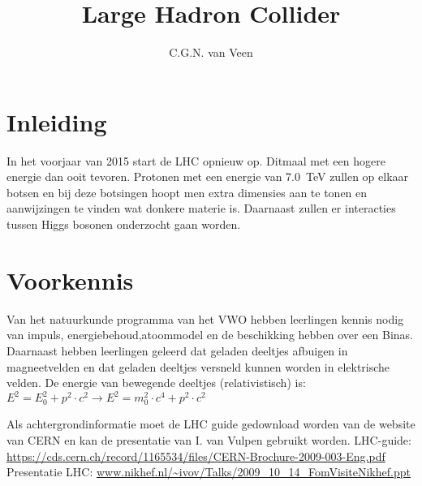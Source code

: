 

\usepackage{hepnames}
\usepackage[version=3]{mhchem}
\usepackage{lipsum}
\usepackage{pgfplots}
\usepackage{amsmath}
\usepackage{tikz}
\usetikzlibrary{shapes}
\usetikzlibrary{positioning,arrows}
\usetikzlibrary{decorations.pathmorphing}
\usetikzlibrary{decorations.markings}


\DeclareRobustCommand{\PgDpp}{\HepParticle{\Delta}{}{++}\xspace}

\title{Large Hadron Collider}
\author{C.G.N. van Veen}



\maketitle

\section{Inleiding} In het voorjaar van 2015 start de LHC opnieuw op. Ditmaal
met een hogere energie dan ooit tevoren. Protonen met een energie van \SI{7.0}{\tera\electronvolt}
zullen op elkaar botsen en bij deze botsingen hoopt men extra dimensies aan te tonen en
aanwijzingen te vinden wat donkere materie is. Daarnaast zullen er interacties tussen Higgs bosonen
onderzocht gaan worden.

\section{Voorkennis}

Van het natuurkunde programma van het VWO hebben leerlingen kennis nodig van impuls,
energiebehoud,atoommodel en de beschikking hebben over een Binas.
Daarnaast hebben leerlingen geleerd dat geladen deeltjes afbuigen in magneetvelden en dat
geladen deeltjes versneld kunnen worden in elektrische velden.
De energie van bewegende deeltjes (relativistisch) is:\\
$E^2 = E_0^2 + p^2 \cdot c^2 \rightarrow  E^2 = m_0^2 \cdot c^4 + p^2 \cdot c^2 $

Als achtergrondinformatie moet de LHC guide gedownload worden van de
website van CERN en kan de presentatie van I. van Vulpen gebruikt worden.
LHC-guide: \url{https://cds.cern.ch/record/1165534/files/CERN-Brochure-2009-003-Eng.pdf}
Presentatie LHC: \url{www.nikhef.nl/~ivov/Talks/2009_10_14_FomVisiteNikhef.ppt}

